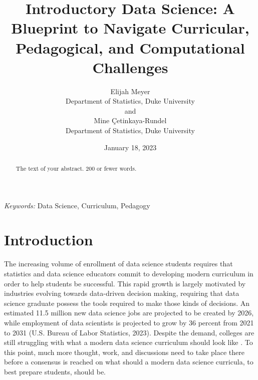 \documentclass[
  12pt]{article}
\begin{document}
\def\spacingset#1{\renewcommand{\baselinestretch}%
{#1}\small\normalsize} \spacingset{1}



\date{January 18, 2023}
\title{\bf Introductory Data Science: A Blueprint to Navigate
Curricular, Pedagogical, and Computational Challenges}
\author{
Elijah Meyer\\
Department of Statistics, Duke University\\
and\\Mine Çetinkaya-Rundel\\
Department of Statistics, Duke University\\
}
\maketitle

\bigskip
\bigskip
\begin{abstract}
The text of your abstract. 200 or fewer words.
\end{abstract}

\noindent%
{\it Keywords:} Data Science, Curriculum, Pedagogy
\vfill

\newpage
\spacingset{1.9} %
\ifdefined\Shaded\renewenvironment{Shaded}{\begin{tcolorbox}[enhanced, sharp corners, borderline west={3pt}{0pt}{shadecolor}, frame hidden, boxrule=0pt, interior hidden, breakable]}{\end{tcolorbox}}\fi

\hypertarget{sec-intro}{%
\section{Introduction}\label{sec-intro}}

The increasing volume of enrollment of data science students
\citep{Redmond2022} requires that statistics and data science educators
commit to developing modern curriculum in order to help students be
successful. This rapid growth is largely motivated by industries
evolving towards data-driven decision making, requiring that data
science graduate possess the tools required to make those kinds of
decisions. An estimated 11.5 million new data science jobs are projected
to be created by 2026, while employment of data scientists is projected
to grow by 36 percent from 2021 to 2031 (U.S. Bureau of Labor
Statistics, 2023). Despite the demand, colleges are still struggling
with what a modern data science curriculum should look like
\citep{Schwab2020}. To this point, much more thought, work, and
discussions need to take place there before a consensus is reached on
what should a modern data science curricula, to best prepare students,
should be.
\end{document}
